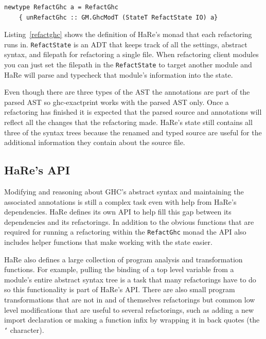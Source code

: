 \begin{lstlisting}[caption={HaRe's Monad \texttt{RefactGhc}},captionpos=b, label=refactghc] 
newtype RefactGhc a = RefactGhc
    { unRefactGhc :: GM.GhcModT (StateT RefactState IO) a}
\end{lstlisting}

Listing~\ref{refactghc} shows the definition of HaRe's monad that each refactoring runs in. \texttt{RefactState} is an ADT that keeps track of all the settings, abstract syntax, and filepath for refactoring a single file. When refactoring client modules you can just set the filepath in the \texttt{RefactState} to target another module and HaRe will parse and typecheck that module's information into the state.

Even though there are three types of the AST the annotations are part of the parsed AST so ghc-exactprint works with the parsed AST only. Once a refactoring has finished it is expected that the parsed source and annotations will reflect all the changes that the refactoring made. HaRe's state still contains all three of the syntax trees because the renamed and typed source are useful for the additional information they contain about the source file. 

\subsection{HaRe's API}

Modifying and reasoning about GHC's abstract syntax and maintaining the associated annotations is still a complex task even with help from HaRe's dependencies. HaRe defines its own API to help fill this gap between its dependencies and its refactorings. In addition to the obvious functions that are required for running a refactoring within the \texttt{RefactGhc} monad the API also includes helper functions that make working with the state easier. 

HaRe also defines a large collection of program analysis and transformation functions. For example, pulling the binding of a top level variable from a module's entire abstract syntax tree is a task that many refactorings have to do so this functionality is part of HaRe's API. There are also small program transformations that are not in and of themselves refactorings but common low level modifications that are useful to several refactorings, such as adding a new import declaration or making a function infix by wrapping it in back quotes (the \texttt{`} character).

